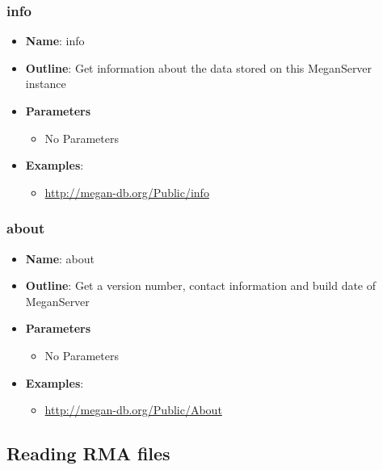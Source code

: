 \documentclass[11pt]{article}
\begin{document}
\subsubsection{info}

\begin{itemize}
	\item \textbf{Name}: info
	\item \textbf{Outline}: Get information about the data stored on this MeganServer instance
	\item \textbf{Parameters}
		\begin{itemize}
			\item No Parameters
		\end{itemize}
	\item \textbf{Examples}:
		\begin{itemize}
			\item \url{http://megan-db.org/Public/info}
		\end{itemize}
\end{itemize}

\subsubsection{about}

\begin{itemize}
	\item \textbf{Name}: about
	\item \textbf{Outline}: Get a version number, contact information and build date of MeganServer
	\item \textbf{Parameters}
		\begin{itemize}
			\item No Parameters
		\end{itemize}
	\item \textbf{Examples}:
		\begin{itemize}
			\item \url{http://megan-db.org/Public/About}
		\end{itemize}
\end{itemize}

\subsection{Reading RMA files}
\end{document}
